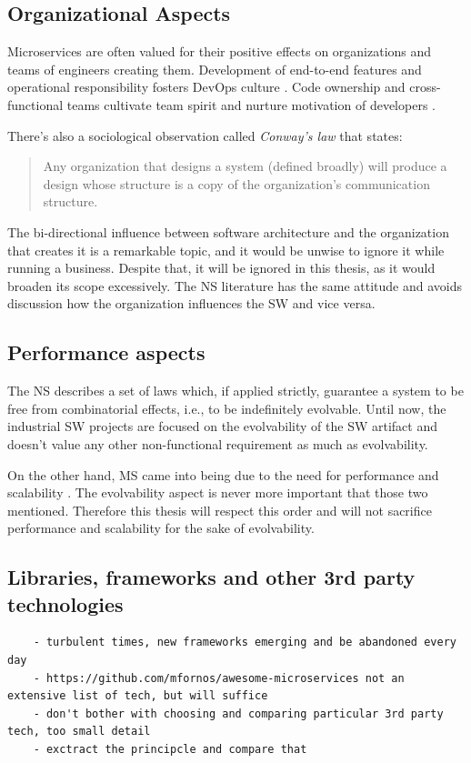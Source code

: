 \documentclass[thesis=M,english,hidelinks]{FITthesis}[2012/10/20]
\begin{document}
\subsection{Organizational Aspects}
Microservices are often valued for their positive effects on organizations and teams of engineers creating them. Development of end-to-end features and operational responsibility fosters DevOps culture \cite{devops-what-is}. Code ownership and cross-functional teams cultivate team spirit and nurture motivation of developers \cite{ms-fow-new-term-def, ms-modelling-with-petter, ms-building-ms}.

There's also a sociological observation called \textit{Conway's law} that states:
\begin{quote}
    Any organization that designs a system (defined broadly) will produce a design whose structure is a copy of the organization's communication structure.~\cite{conways-law}
\end{quote}

The bi-directional influence between software architecture and the organization that creates it is a remarkable topic, and it would be unwise to ignore it while running a business. Despite that, it will be ignored in this thesis, as it would broaden its scope excessively. The \acrshort{NS} literature \cite{ns-recreating, ns-toward-general-theory} has the same attitude and avoids discussion how the organization influences the \acrshort{SW} and vice versa.

\subsection{Performance aspects}
The \acrlong{NS} describes a set of laws which, if applied strictly, guarantee a system to be free from combinatorial effects, i.e., to be indefinitely evolvable. Until now, the industrial \acrlong{SW} projects \cite{ns-it-isnt-different, ns-exploring-defence} are focused on the evolvability of the \acrshort{SW} artifact and doesn't value any other non-functional requirement as much as evolvability.

On the other hand, \acrlong{MS} came into being due to the need for performance and scalability \cite{ms-building-ms, ms-evolutionary-arch}. The evolvability aspect is never more important that those two mentioned. Therefore this thesis will respect this order and will not sacrifice performance and scalability for the sake of evolvability.

\subsection{Libraries, frameworks and other 3rd party technologies}
\begin{verbatim}
    - turbulent times, new frameworks emerging and be abandoned every day
    - https://github.com/mfornos/awesome-microservices not an extensive list of tech, but will suffice
    - don't bother with choosing and comparing particular 3rd party tech, too small detail
    - exctract the principcle and compare that
\end{verbatim}
\end{document}
